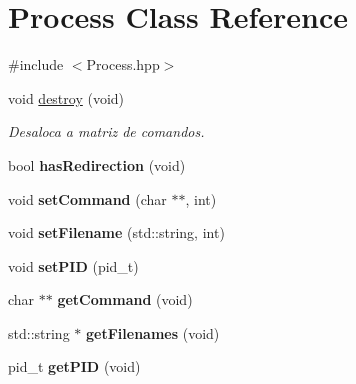 \hypertarget{classProcess}{
\section{Process Class Reference}
\label{classProcess}
}


{\ttfamily \#include $<$Process.hpp$>$}

\begin{DoxyCompactItemize}
\item 
\hypertarget{classProcess_a171e59c307275297e3e1af1db84573cd}{
void \hyperlink{classProcess_a171e59c307275297e3e1af1db84573cd}{destroy} (void)}
\label{classProcess_a171e59c307275297e3e1af1db84573cd}

\begin{DoxyCompactList}\small\item\em Desaloca a matriz de comandos. \end{DoxyCompactList}\item 
\hypertarget{classProcess_ad61ee8eb2717e58335c77a644c636481}{
bool {\bfseries hasRedirection} (void)}
\label{classProcess_ad61ee8eb2717e58335c77a644c636481}

\item 
\hypertarget{classProcess_af07d9b99e85006a092ff5bfd02f9870e}{
void {\bfseries setCommand} (char $\ast$$\ast$, int)}
\label{classProcess_af07d9b99e85006a092ff5bfd02f9870e}

\item 
\hypertarget{classProcess_ae70e6cd440d972f6be31b9990241e629}{
void {\bfseries setFilename} (std::string, int)}
\label{classProcess_ae70e6cd440d972f6be31b9990241e629}

\item 
\hypertarget{classProcess_a1fe062af26e2daece35c52185b3e5041}{
void {\bfseries setPID} (pid\_\-t)}
\label{classProcess_a1fe062af26e2daece35c52185b3e5041}

\item 
\hypertarget{classProcess_a673f9fa73be0dc8ce7671ec936506523}{
char $\ast$$\ast$ {\bfseries getCommand} (void)}
\label{classProcess_a673f9fa73be0dc8ce7671ec936506523}

\item 
\hypertarget{classProcess_a1a31bd04c45cd937a94cb44e16756903}{
std::string $\ast$ {\bfseries getFilenames} (void)}
\label{classProcess_a1a31bd04c45cd937a94cb44e16756903}

\item 
\hypertarget{classProcess_aec20c9e63556604a0c2589f2aa5fcf42}{
pid\_\-t {\bfseries getPID} (void)}
\label{classProcess_aec20c9e63556604a0c2589f2aa5fcf42}


\end{DoxyCompactItemize}
